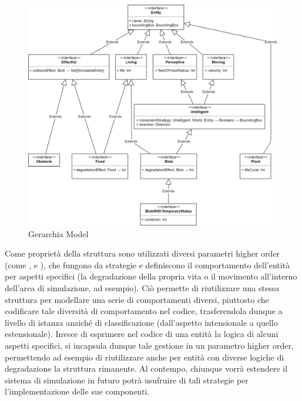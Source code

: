 \begin{figure}[h!]
\centering
\includegraphics[width=\textwidth, scale=0.44]{img/ModelHierarchy.png}
\caption{Gerarchia Model}
\label{fig:modelhierarchy3}
\end{figure}

Come proprietà della struttura sono utilizzati diversi parametri higher order (come ,  e ), che fungono da strategie e definiscono il comportamento dell’entità per aspetti specifici (la degradazione della propria vita o il movimento all’interno dell’area di simulazione, ad esempio). Ciò permette di riutilizzare una stessa struttura per modellare una serie di comportamenti diversi, piuttosto che codificare tale diversità di comportamento nel codice, trasferendola dunque a livello di istanza anziché di classificazione (dall’aspetto intensionale a quello estensionale). Invece di esprimere nel codice di una entità la logica di alcuni aspetti specifici, si incapsula dunque tale gestione in un parametro higher order, permettendo ad esempio di riutilizzare anche per entità con diverse logiche di degradazione la struttura rimanente. Al contempo, chiunque vorrà estendere il sistema di simulazione in futuro potrà usufruire di tali strategie per l’implementazione delle sue componenti.


